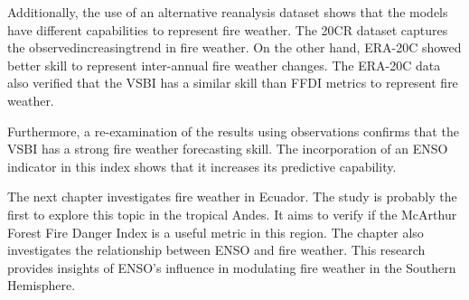 Additionally, the use of an alternative reanalysis dataset shows that
the models have different capabilities to represent fire weather.
The 20CR dataset captures the observed\textemdash increasing\textemdash trend
in fire weather. On the other hand, ERA-20C showed better skill to
represent inter-annual fire weather changes. The ERA-20C data also
verified that the VSBI has a similar skill than FFDI metrics to represent
fire weather. 

Furthermore, a re-examination of the results using observations confirms
that the VSBI has a strong fire weather forecasting skill. The incorporation
of an ENSO indicator in this index shows that it increases its predictive
capability. 

The next chapter investigates fire weather in Ecuador. The study is
probably the first to explore this topic in the tropical Andes. It
aims to verify if the McArthur Forest Fire Danger Index is a useful
metric in this region. The chapter also investigates the relationship
between ENSO and fire weather. This research provides insights of
ENSO's influence in modulating fire weather in the Southern Hemisphere. 

